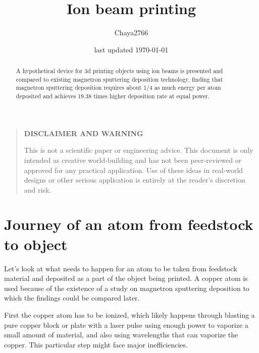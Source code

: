 \documentclass[a4paper]{article}
\title{Ion beam printing}
\author{Chaya2766}
\date{last updated \today}
\begin{document}
	\sffamily
	\hyphenchar{}
	\sloppy
	
	\maketitle
	
	\textbf{
		\sloppy
		\hyphenchar{}
		}
	
	\vfill
	
	\begin{abstract}
		A hypothetical device for 3d printing objects using ion beams is presented and compared to existing magnetron sputtering deposition technology, finding that magnetron sputtering deposition requires about 1/4 as much energy per atom deposited and achieves 19.38 times higher deposition rate at equal power.
	\end{abstract}
	
	\vfill
	
	\begin{quote}
		\begin{center}
			\textbf{DISCLAIMER AND WARNING}
		\end{center}
		
		This is not a scientific paper or engineering advice.
		This document is only intended as creative world‑building and has not been peer‑reviewed or approved for any practical application.
		Use of these ideas in real‑world designs or other serious application is entirely at the reader’s discretion and risk.
	\end{quote}
	
	\vfill
	
	\tableofcontents
	
	\pagebreak
	
	\section{Journey of an atom from feedstock to object}
	
	Let's look at what needs to happen for an atom to be taken from feedstock material and deposited as a part of the object being printed.
	A copper atom is used because of the existence of a study on magnetron sputtering deposition to which the findings could be compared later.
	
	\medskip
	
	First the copper atom has to be ionized, which likely happens through blasting a pure copper block or plate with a laser pulse using enough power to vaporize a small amount of material, and also using wavelengths that can vaporize the copper.
	This particular step might face major inefficiencies.
	
\end{document}
